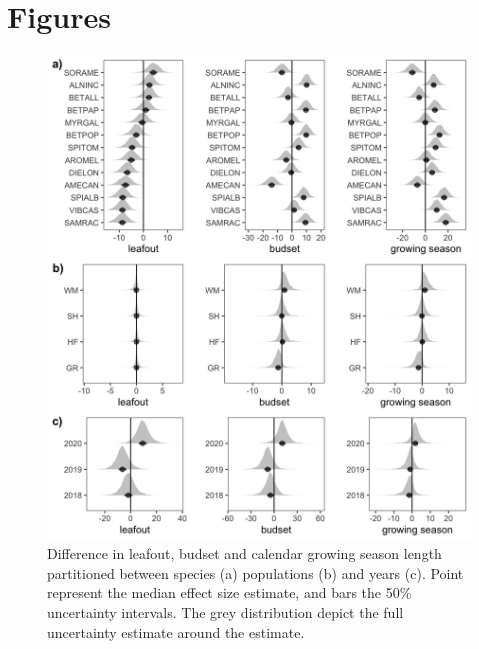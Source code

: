 \documentclass[12 pt]{article}
\begin{document}

\section{Figures} %

\begin{figure}[h!]
    \centering
 \includegraphics[width=.7\textwidth]{..//analyses/figures/var_parts.jpeg}
    \caption{Difference in leafout, budset and calendar growing season length partitioned between species (a) populations (b) and years (c). Point represent the median effect size estimate, and bars the 50\% uncertainty intervals. The grey distribution depict the full uncertainty estimate around the estimate.}
    \label{fig:vapar}
\end{figure}
\end{document}
